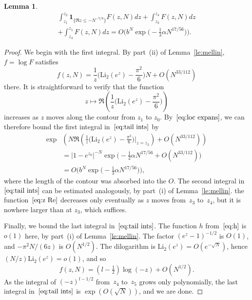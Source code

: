 \documentclass[a4paper]{amsart}
\newtheorem{lemma}[theorem]{Lemma}
\begin{document}
\begin{lemma}\label{le:tail}
  \begin{multline}\label{eq:tail ints}
     \int_{z_1}^{z_2} \mathbf{1}_{\{\Re z \leq -N^{-7/8}\}}F(z,N) dz
     + \int_{z_3}^{z_4}F(z,N) dz \\
+ \int_{z_4}^{z_5}F(z,N)dz = O\Big(b^N \exp\Big( -\tfrac13 \alpha N^{17/56} \Big)\Big).
  \end{multline}
\end{lemma}
\begin{proof}
  We begin with the first integral. By part~(ii)
  of Lemma~\ref{le:mellin}, $f=\log F$ satisfies
  \[
    f(z,N) = \frac{1}{z}\Big( \mathrm{Li}_2(e^z) - \frac{\pi^2}{6}\Big)N
      + O(N^{33/112})
  \]
  there. It is straightforward to verify that the function
  \begin{equation}\label{eq:z Re}
   z\mapsto \Re\left(
  \frac{1}{z}\Big( \mathrm{Li}_2(e^z) - \frac{\pi^2}{6}\Big)\right)
  \end{equation}
  increases as $z$ moves along the contour from $z_1$ to $z_0$.
  By~$\eqref{eq:loc expans}$, we can therefore bound the first integral in~$\eqref{eq:tail ints}$ by 
  \begin{align*}
    \exp &\left(    N \Re \left(     \frac{1}{z}
    \Big(     \mathrm{Li}_2(e^z) - \frac{\pi^2}{6}  \Big)
    \Big|_{z=z_2}
    \right) 
    + O(N^{33/112})  \right)    \\
    &= |1-e^{z_0}|^{-N} \exp\Big( -\tfrac12 \alpha N^{17/56} + O(N^{33/112})\Big) \\
    &=   O\Big(b^N \exp\Big( -\tfrac13 \alpha N^{17/56} \Big)\Big),
  \end{align*}
  where the length of the contour was absorbed into the $O$.
  The second integral in~$\eqref{eq:tail ints}$ can be estimated analogously,
   by part~(i) of Lemma~\ref{le:mellin}.
  the function~$\eqref{eq:z Re}$ decreases only eventually as $z$ moves
  from~$z_3$ to~$z_4$, but it is nowhere larger than at $z_3$, which suffices.

  Finally, we bound the last integral in~$\eqref{eq:tail ints}$. The function
  $h$ from~$\eqref{eq:h}$ is $o(1)$ here, by part~(i) of Lemma~\ref{le:mellin}. 
  The factor $(e^z-1)^{-1/2}$ is $O(1)$, and $-\pi^2N/(6z)$ is
  $O(N^{1/2})$. The dilogarithm is $\mathrm{Li}_2(e^z) = O(e^{-\sqrt{N}})$,
  hence $(N/z)\mathrm{Li}_2(e^z) =  o(1)$,  and so
  \[
     f(z,N) = (l-\tfrac12)\log(-z) +O(N^{1/2}).
  \]
  As the integral of $(-z)^{l-1/2}$ from~$z_4$ to~$z_5$ grows only
  polynomially, the last integral in~$\eqref{eq:tail ints}$
  is $\exp(O(\sqrt{N}))$, and we are done.
\end{proof}
\end{document}
